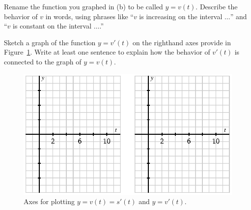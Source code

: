\begin{pa}
	\item Rename the function you graphed in (b) to be called $y = v(t)$.  Describe the behavior of $v$ in words, using phrases like ``$v$ is increasing on the interval $\ldots$'' and ``$v$ is constant on the interval $\ldots$.''
	\item Sketch a graph of the function $y = v'(t)$ on the righthand axes provide in Figure~\ref{F:1.6.PA1b}.  Write at least one sentence to explain how the behavior of $v'(t)$ is connected to the graph of $y=v(t)$.
\ea
\begin{figure}[h]
\begin{center}
\includegraphics{figures/1_6_PA1b.eps}
\caption{Axes for plotting $y = v(t) = s'(t)$ and $y = v'(t)$.} \label{F:1.6.PA1b}
\end{center}
\end{figure}
\end{pa} 

\afterpa

